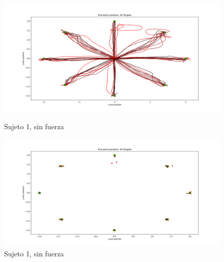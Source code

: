 \documentclass[a4paper,11pt, oneside]{book}
\begin{document}
\begin{figure}[H]
	\begin{minipage}[b]{0.5\linewidth}
		\centering
		\includegraphics[width=\linewidth]{sujeto1/no_force/trayectorias}
		\caption{Sujeto 1, sin fuerza}
		\label{1-fase1-1}
	\end{minipage}
	\hspace{0.5cm}
	\begin{minipage}[b]{0.5\linewidth}
		\centering
		\includegraphics[width=\linewidth]{sujeto1/no_force/trayectorias_puntos}
		\caption{Sujeto 1, sin fuerza}
		\label{1-fase1-2}
	\end{minipage}
\end{figure}
\end{document}

